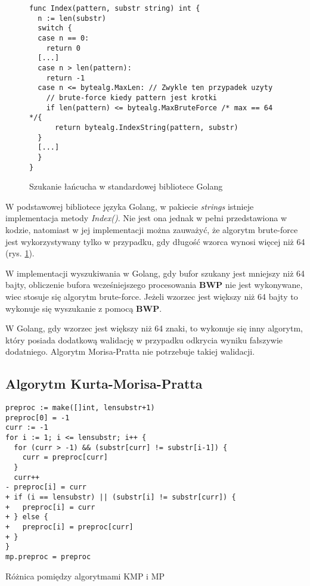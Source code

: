 \begin{figure}[htbp]
    \centering
\begin{lstlisting}
func Index(pattern, substr string) int {
  n := len(substr)
  switch {
  case n == 0:
    return 0
  [...]
  case n > len(pattern):
    return -1
  case n <= bytealg.MaxLen: // Zwykle ten przypadek uzyty
    // brute-force kiedy pattern jest krotki
    if len(pattern) <= bytealg.MaxBruteForce /* max == 64 */{
      return bytealg.IndexString(pattern, substr)
  }
  [...]
  }
}
\end{lstlisting}
\caption{Szukanie łańcucha w standardowej bibliotece Golang}
\label{fig:code:golangSearchInsideString}
\end{figure}
W podstawowej bibliotece języka Golang, w pakiecie \textit{strings} istnieje 
implementacja metody \textit{Index()}. Nie jest ona jednak w pełni przedstawiona
w kodzie, natomiast w jej implementacji można zauważyć, że algorytm brute-force
jest wykorzystywany tylko w przypadku, gdy długość wzorca wynosi więcej niż 64 
(rys. \ref{fig:code:golangSearchInsideString}).

W implementacji wyszukiwania w Golang, gdy bufor szukany jest mniejszy niż 64 bajty,
obliczenie bufora wcześniejszego procesowania \textbf{BWP} nie jest wykonywane, 
wiec stosuje się algorytm brute-force. Jeżeli wzorzec jest większy niż 64 
bajty to wykonuje się wyszukanie z pomocą \textbf{BWP}.

W Golang, gdy wzorzec jest większy niż
64 znaki, to wykonuje się inny algorytm, który posiada dodatkową walidację w
przypadku odkrycia wyniku fałszywie dodatniego. Algorytm Morisa-Pratta nie
 potrzebuje takiej walidacji.

\subsection{Algorytm Kurta-Morisa-Pratta}

\begin{listing}[H]
    \begin{verbatim}
preproc := make([]int, lensubstr+1)
preproc[0] = -1
curr := -1
for i := 1; i <= lensubstr; i++ {
  for (curr > -1) && (substr[curr] != substr[i-1]) {
    curr = preproc[curr]
  }
  curr++
- preproc[i] = curr
+ if (i == lensubstr) || (substr[i] != substr[curr]) {
+   preproc[i] = curr
+ } else {
+   preproc[i] = preproc[curr]
+ }
}
mp.preproc = preproc
    \end{verbatim}
  \caption{Różnica pomiędzy algorytmami KMP i MP}
  \label{fig:code:KurtMorisPrattVsMorisPratt}
\end{listing}

